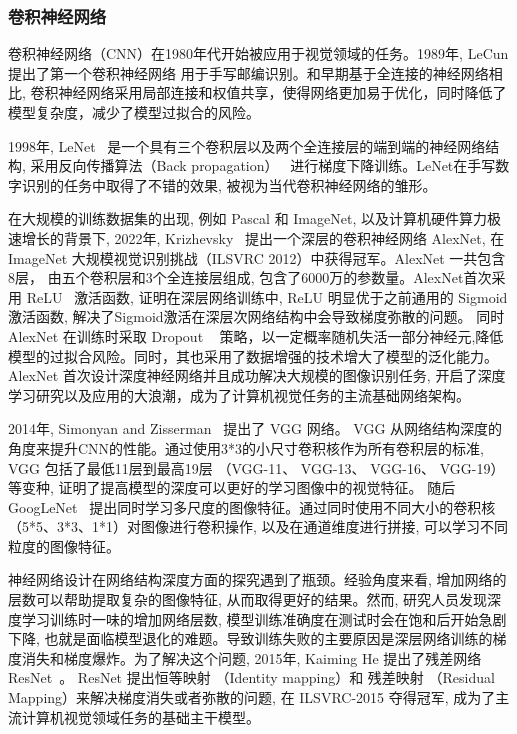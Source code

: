 \subsubsection{卷积神经网络}
卷积神经网络（CNN）在1980年代开始被应用于视觉领域的任务。1989年, LeCun 提出了第一个卷积神经网络\cite{lecun1989backpropagation} 用于手写邮编识别。和早期基于全连接的神经网络相比, 卷积神经网络采用局部连接和权值共享，使得网络更加易于优化，同时降低了模型复杂度，减少了模型过拟合的风险。\par
1998年, LeNet~\cite{lecun1998gradient} 是一个具有三个卷积层以及两个全连接层的端到端的神经网络结构, 采用反向传播算法（Back propagation）~\cite{rumelhart1986learning} 进行梯度下降训练。LeNet在手写数字识别的任务中取得了不错的效果, 被视为当代卷积神经网络的雏形。\par
在大规模的训练数据集的出现, 例如 Pascal 和 ImageNet, 以及计算机硬件算力极速增长的背景下, 2022年, Krizhevsky~\cite{krizhevsky2017imagenet} 提出一个深层的卷积神经网络 AlexNet, 在ImageNet 大规模视觉识别挑战（ILSVRC 2012）中获得冠军。AlexNet 一共包含8层， 由五个卷积层和3个全连接层组成, 包含了6000万的参数量。AlexNet首次采用 ReLU~\cite{glorot2011deep} 激活函数, 证明在深层网络训练中, ReLU 明显优于之前通用的 Sigmoid 激活函数, 解决了Sigmoid激活在深层次网络结构中会导致梯度弥散的问题。 同时AlexNet 在训练时采取 Dropout ~\cite{srivastava2014dropout} 策略，以一定概率随机失活一部分神经元,降低模型的过拟合风险。同时，其也采用了数据增强的技术增大了模型的泛化能力。AlexNet 首次设计深度神经网络并且成功解决大规模的图像识别任务, 开启了深度学习研究以及应用的大浪潮，成为了计算机视觉任务的主流基础网络架构。 \par
2014年, Simonyan and Zisserman~\cite{simonyan2014very} 提出了 VGG 网络。 VGG 从网络结构深度的角度来提升CNN的性能。通过使用3*3的小尺寸卷积核作为所有卷积层的标准, VGG 包括了最低11层到最高19层 （VGG-11、 VGG-13、 VGG-16、 VGG-19）等变种, 证明了提高模型的深度可以更好的学习图像中的视觉特征。 随后 GoogLeNet~\cite{szegedy2015going} 提出同时学习多尺度的图像特征。通过同时使用不同大小的卷积核（5*5、3*3、1*1）对图像进行卷积操作, 以及在通道维度进行拼接, 可以学习不同粒度的图像特征。\par
神经网络设计在网络结构深度方面的探究遇到了瓶颈。经验角度来看, 增加网络的层数可以帮助提取复杂的图像特征, 从而取得更好的结果。然而, 研究人员发现深度学习训练时一味的增加网络层数, 模型训练准确度在测试时会在饱和后开始急剧下降, 也就是面临模型退化的难题。导致训练失败的主要原因是深层网络训练的梯度消失和梯度爆炸。为了解决这个问题, 2015年, Kaiming He 提出了残差网络 ResNet~\cite{he2016deep}。 ResNet 提出恒等映射 （Identity mapping）和 残差映射 （Residual Mapping）来解决梯度消失或者弥散的问题, 在 ILSVRC-2015 夺得冠军, 成为了主流计算机视觉领域任务的基础主干模型。\par
